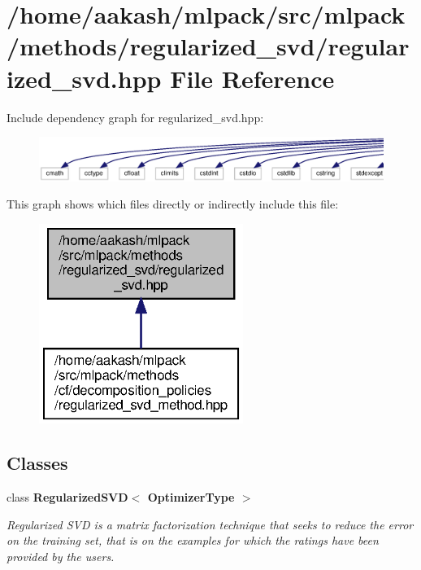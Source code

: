 \section{/home/aakash/mlpack/src/mlpack/methods/regularized\+\_\+svd/regularized\+\_\+svd.hpp File Reference}
\label{regularized__svd_8hpp}
Include dependency graph for regularized\+\_\+svd.\+hpp\+:
\nopagebreak
\begin{figure}[H]
\begin{center}
\leavevmode
\includegraphics[width=350pt]{regularized__svd_8hpp__incl}
\end{center}
\end{figure}
This graph shows which files directly or indirectly include this file\+:
\nopagebreak
\begin{figure}[H]
\begin{center}
\leavevmode
\includegraphics[width=188pt]{regularized__svd_8hpp__dep__incl}
\end{center}
\end{figure}
\subsection*{Classes}
\begin{DoxyCompactItemize}
\item 
class \textbf{ Regularized\+S\+V\+D$<$ Optimizer\+Type $>$}
\begin{DoxyCompactList}\small\item\em Regularized S\+VD is a matrix factorization technique that seeks to reduce the error on the training set, that is on the examples for which the ratings have been provided by the users. \end{DoxyCompactList}\end{DoxyCompactItemize}
